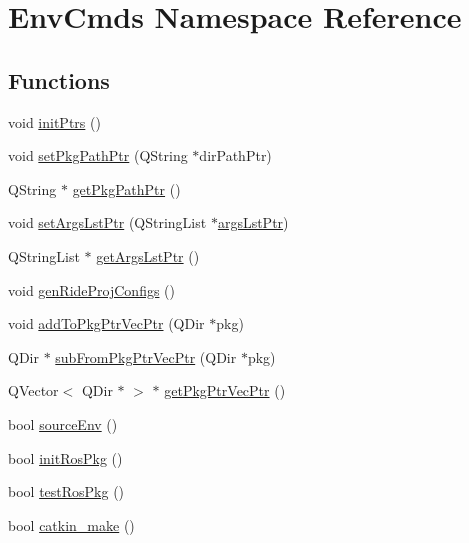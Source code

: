 \hypertarget{namespace_env_cmds}{\section{Env\-Cmds Namespace Reference}
\label{namespace_env_cmds}
}
\subsection*{Functions}
\begin{DoxyCompactItemize}
\item 
void \hyperlink{namespace_env_cmds_abe1365379eb9cea41f7ad9715c84fb88}{init\-Ptrs} ()
\item 
void \hyperlink{namespace_env_cmds_acea3865613ce3e5d751ba9283b29b11b}{set\-Pkg\-Path\-Ptr} (Q\-String $\ast$dir\-Path\-Ptr)
\item 
Q\-String $\ast$ \hyperlink{namespace_env_cmds_a6c88978d5a0969a49a46bb31073e329f}{get\-Pkg\-Path\-Ptr} ()
\item 
void \hyperlink{namespace_env_cmds_a43a545c45445cab03f1d236aab2ef143}{set\-Args\-Lst\-Ptr} (Q\-String\-List $\ast$\hyperlink{namespace_env_cmds_a65efdbb4d947990b4cc75dd65ce5a034}{args\-Lst\-Ptr})
\item 
Q\-String\-List $\ast$ \hyperlink{namespace_env_cmds_aee91266a273ed1c62d1c422be14be520}{get\-Args\-Lst\-Ptr} ()
\item 
void \hyperlink{namespace_env_cmds_a165b70f29ffd662b5e27783b7389a307}{gen\-Ride\-Proj\-Configs} ()
\item 
void \hyperlink{namespace_env_cmds_aaf09ee7f28925514a4741efabd92a6e4}{add\-To\-Pkg\-Ptr\-Vec\-Ptr} (Q\-Dir $\ast$pkg)
\item 
Q\-Dir $\ast$ \hyperlink{namespace_env_cmds_a930ec841071d16f0824f9d15db326eb0}{sub\-From\-Pkg\-Ptr\-Vec\-Ptr} (Q\-Dir $\ast$pkg)
\item 
Q\-Vector$<$ Q\-Dir $\ast$ $>$ $\ast$ \hyperlink{namespace_env_cmds_a0b6e41795e46225eb1da07fdcfacccbf}{get\-Pkg\-Ptr\-Vec\-Ptr} ()
\item 
bool \hyperlink{namespace_env_cmds_a8b7baa6b7b2d7039a9bb068d02f8612c}{source\-Env} ()
\item 
bool \hyperlink{namespace_env_cmds_a9ee08d64a0ceac05661e3e319c8a1863}{init\-Ros\-Pkg} ()
\item 
bool \hyperlink{namespace_env_cmds_a9fafdf228ab9f3ecb0c76490515e1f92}{test\-Ros\-Pkg} ()
\item 
bool \hyperlink{namespace_env_cmds_a96b0fb9c20ed5e42712d2c633d22d32e}{catkin\-\_\-make} ()
\end{DoxyCompactItemize}
